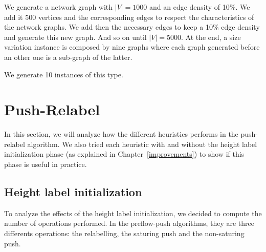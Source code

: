 We generate a network graph with $|V|=1000$ and an edge density of 10\%. We add it 500 vertices and the corresponding edges to respect the characteristics of the network graphs. We add then the necessary edges to keep a 10\% edge density and generate this new graph. And so on until $|V|=5000$. At the end, a size variation instance is composed by nine graphs where each graph generated before an other one is a sub-graph of the latter.

We generate 10 instances of this type.



\section{Push-Relabel}

In this section, we will analyze how the different heuristics performs in the push-relabel algorithm. We also tried each heuristic with and without the height label initialization phase (as explained in Chapter~\ref{improvements}) to show if this phase is useful in practice.
\subsection{Height label initialization}

To analyze the effects of the height label initialization, we decided to compute the number of operations performed. In the preflow-push algorithms, they are three differents operations: the relabelling, the saturing push and the non-saturing push.

